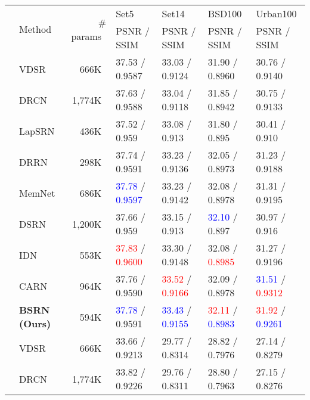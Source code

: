 \documentclass[runningheads]{llncs}
\begin{document}
\begin{table*}[t!]
	\scriptsize
	\begin{center}
		\begin{tabular}{c l r l l l l}
			\noalign{\smallskip}
			\hline
			\noalign{\smallskip}
			\multirow{2}{*}{~Scale~} & \multirow{2}{*}{Method} & \multirow{2}{*}{\# params~} & Set5 & Set14 & BSD100 & Urban100 \\
			& & & PSNR / SSIM~ & PSNR / SSIM~ & PSNR / SSIM~ & PSNR / SSIM~ \\
			\noalign{\smallskip}
			\hline
			\noalign{\smallskip}
			\multirow{9}{*}{2} & VDSR \cite{kim2016accurate} & 666K~ & 37.53 / 0.9587 & 33.03 / 0.9124 & 31.90 / 0.8960 & 30.76 / 0.9140 \\
			& DRCN \cite{kim2016deeply} & 1,774K~ & 37.63 / 0.9588 & 33.04 / 0.9118 & 31.85 / 0.8942 & 30.75 / 0.9133 \\
			& LapSRN \cite{lai2017deep} & 436K~ & 37.52 / 0.959~~ & 33.08 / 0.913~~ & 31.80 / 0.895~~ & 30.41 / 0.910~~ \\
			& DRRN \cite{tai2017image} & 298K~ & 37.74 / 0.9591 & 33.23 / 0.9136 & 32.05 / 0.8973 & 31.23 / 0.9188 \\
			& MemNet \cite{tai2017memnet} & 686K~ & \textcolor{blue}{37.78} / \textcolor{blue}{0.9597} & 33.23 / 0.9142 & 32.08 / 0.8978 & 31.31 / 0.9195 \\
			& DSRN \cite{han2018image} & 1,200K~ & 37.66 / 0.959~~ & 33.15 / 0.913~~ & \textcolor{blue}{32.10} / 0.897~~ & 30.97 / 0.916~~ \\
			& IDN \cite{hui2018fast} & 553K~ & \textcolor{red}{37.83} / \textcolor{red}{0.9600} & 33.30 / 0.9148 & 32.08 / \textcolor{red}{0.8985} & 31.27 / 0.9196 \\
			& CARN \cite{ahn2018fast} & 964K~ & 37.76 / 0.9590 & \textcolor{red}{33.52} / \textcolor{red}{0.9166} & 32.09 / 0.8978 & \textcolor{blue}{31.51} / \textcolor{red}{0.9312} \\
			& \textbf{BSRN (Ours)} & 594K~ & \textcolor{blue}{37.78} / 0.9591 & \textcolor{blue}{33.43} / \textcolor{blue}{0.9155} & \textcolor{red}{32.11} / \textcolor{blue}{0.8983} & \textcolor{red}{31.92} / \textcolor{blue}{0.9261} \\
			\noalign{\smallskip}
			\hline
			\noalign{\smallskip}
			\multirow{8}{*}{3} & VDSR \cite{kim2016accurate} & 666K~ & 33.66 / 0.9213 & 29.77 / 0.8314 & 28.82 / 0.7976 & 27.14 / 0.8279 \\
			& DRCN \cite{kim2016deeply} & 1,774K~ & 33.82 / 0.9226 & 29.76 / 0.8311 & 28.80 / 0.7963 & 27.15 / 0.8276 \\

\end{tabular}
\end{center}
\end{table*}
\end{document}
